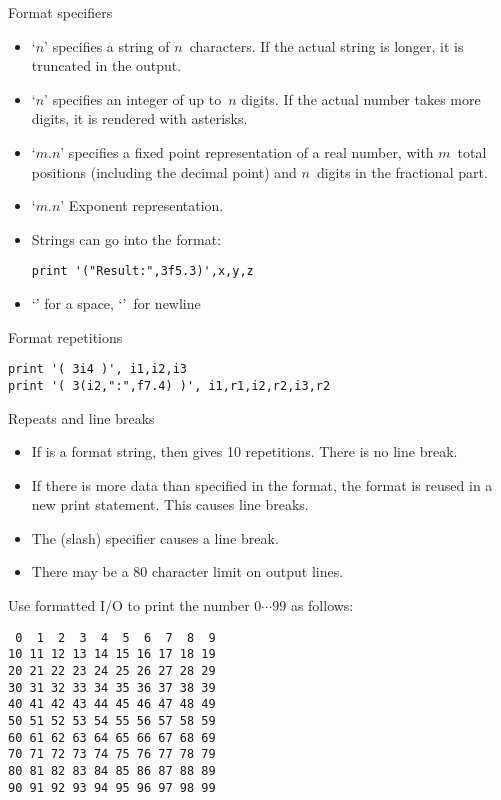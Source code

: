 \begin{slide}{Format specifiers}
  \label{sl:formatspec}
  \begin{itemize}
  \item `$n$' specifies a string of $n$~characters. If the actual
    string is longer, it is truncated in the output.
  \item `$n$' specifies an integer of up to~$n$ digits. If the actual
    number takes more digits, it is rendered with asterisks.
  \item `$m.n$' specifies a fixed point representation of a real
    number, with $m$~total positions (including the decimal point)
    and $n$~digits in the fractional part.
  \item `$m.n$' Exponent representation.
  \item Strings can go into the format:
\begin{verbatim}
print '("Result:",3f5.3)',x,y,z
\end{verbatim}
\item `' for a space, `\n{/}'~for newline
  \end{itemize}
\end{slide}

\begin{block}{Format repetitions}
  \label{sl:fformat-rep}
\begin{verbatim}
print '( 3i4 )', i1,i2,i3
print '( 3(i2,":",f7.4) )', i1,r1,i2,r2,i3,r2
\end{verbatim}
\end{block}

\begin{block}{Repeats and line breaks}
  \label{sl:formatrepeat}
  \begin{itemize}
  \item If  is a format string, then  gives 10
    repetitions. There is no line break.
  \item If there is more data than specified in the format, the format
    is reused in a new print statement. This causes line breaks.
  \item The \n{/} (slash) specifier causes a line break.
  \item There may be a 80 character limit on output lines.
  \end{itemize}
\end{block}

\begin{exercise}
  \label{ex:f99}
  Use formatted I/O to print the number $0\cdots99$ as follows:
\begin{verbatim}
 0  1  2  3  4  5  6  7  8  9
10 11 12 13 14 15 16 17 18 19
20 21 22 23 24 25 26 27 28 29
30 31 32 33 34 35 36 37 38 39
40 41 42 43 44 45 46 47 48 49
50 51 52 53 54 55 56 57 58 59
60 61 62 63 64 65 66 67 68 69
70 71 72 73 74 75 76 77 78 79
80 81 82 83 84 85 86 87 88 89
90 91 92 93 94 95 96 97 98 99
\end{verbatim}
\end{exercise}

